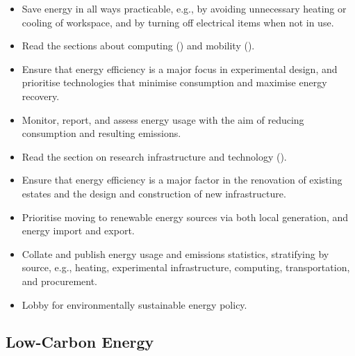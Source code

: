 \documentclass[../SustainableHEP.tex]{subfiles}
\begin{document}
\begin{reco2}{\currentname}
{
\begin{itemize}[leftmargin=6 mm]
\setlength{\itemsep}{\recskip}
\item Save energy in all ways practicable, e.g., by avoiding unnecessary heating or cooling of workspace, and by turning off electrical items when not in use.

\item Read the sections about computing () and mobility ().

\end{itemize}
}
{
\begin{itemize}[leftmargin=6 mm]
\setlength{\itemsep}{\recskip}
\item Ensure that energy efficiency is a major focus in experimental design, and prioritise technologies that minimise consumption and maximise energy recovery.

\item Monitor, report, and assess energy usage with the aim of reducing consumption and resulting emissions.

\item Read the section on research infrastructure and technology ().
\end{itemize}
}
{
\begin{itemize}[leftmargin=6 mm]
\setlength{\itemsep}{\recskip}
\item Ensure that energy efficiency is a major factor in the renovation of existing estates and the design and construction of new infrastructure.

\item Prioritise moving to renewable energy sources via both local generation, and energy import and export.

\item Collate and publish energy usage and emissions statistics, stratifying by source, e.g., heating, experimental infrastructure, computing, transportation, and procurement.

\item Lobby for environmentally sustainable energy policy.
\end{itemize}}

\end{reco2}


\newpage

\subsection{Low-Carbon Energy}
\label{sec:Ene-Transition}
\end{document}
